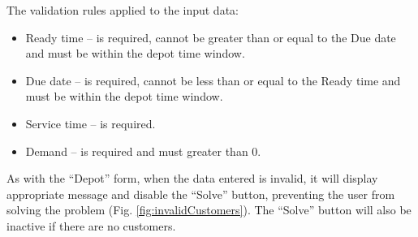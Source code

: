 \documentclass[a4paper,twoside,12pt]{book}
\begin{document}
The validation rules applied to the input data:
\begin{itemize}
    \item Ready time -- is required, cannot be greater than or equal to the Due date and must be within the depot time window.
    \item Due date -- is required, cannot be less than or equal to the Ready time and must be within the depot time window.
    \item Service time -- is required.
    \item Demand -- is required and must greater than 0.
\end{itemize}

As with the ``Depot'' form, when the data entered is invalid, it will display appropriate message and disable the ``Solve'' button, preventing the user from solving the problem (Fig. \ref{fig:invalidCustomers}). The ``Solve'' button will also be inactive if there are no customers.
\end{document}

